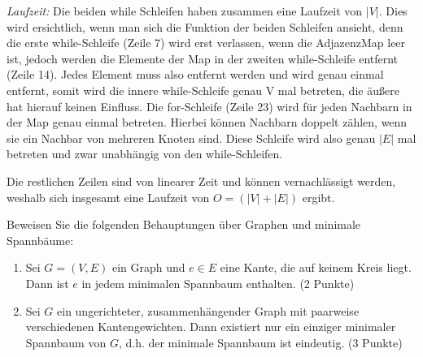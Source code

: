 \documentclass[ngerman,landscape,twocolumn]{adtexsheet}
\begin{document}
\emph{Laufzeit:} Die beiden while Schleifen haben zusammen eine Laufzeit von $|V|$. Dies wird ersichtlich, wenn man sich die Funktion der beiden Schleifen ansieht, denn die erste while-Schleife (Zeile 7) wird erst verlassen, wenn die AdjazenzMap leer ist, jedoch werden die Elemente der Map in der zweiten while-Schleife entfernt (Zeile 14). Jedes Element muss also entfernt werden und wird genau einmal entfernt, somit wird die innere while-Schleife genau V mal betreten, die äußere hat hierauf keinen Einfluss. Die for-Schleife (Zeile 23) wird für jeden Nachbarn in der Map genau einmal betreten. Hierbei können Nachbarn doppelt zählen, wenn sie ein Nachbar von mehreren Knoten sind. Diese Schleife wird also genau $|E|$ mal betreten und zwar unabhängig von den while-Schleifen.

Die restlichen Zeilen sind von linearer Zeit und können vernachlässigt werden, weshalb sich insgesamt eine Laufzeit von $O=(|V|+|E|)$ ergibt.

\begin{question}
    Beweisen Sie die folgenden Behauptungen über Graphen und minimale Spannbäume:
    \begin{enumerate}
        \item Sei $G = (V, E)$ ein Graph und $e \in E$ eine Kante, die auf keinem Kreis liegt. Dann ist $e$ in jedem minimalen Spannbaum enthalten. (2 Punkte)
        \item Sei $G$ ein ungerichteter, zusammenhängender Graph mit paarweise verschiedenen Kantengewichten. Dann existiert nur ein einziger minimaler Spannbaum von $G$, d.h. der minimale Spannbaum ist eindeutig. (3 Punkte)
    \end{enumerate}
\end{question}
\end{document}
